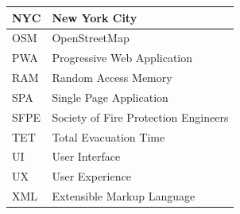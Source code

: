 \documentclass[12pt,a4paper,oneside]{report}
\begin{document}
\begin{table}[H]
\begin{tabular}{|l|l|}
\hline
NYC & New York City \\
\hline
OSM & OpenStreetMap \\
\hline
PWA & Progressive Web Application \\
\hline
RAM & Random Access Memory \\
\hline
SPA & Single Page Application \\
\hline
SFPE & Society of Fire Protection Engineers \\
\hline
TET & Total Evacuation Time \\
\hline
UI & User Interface \\
\hline
UX & User Experience \\
\hline
XML & Extensible Markup Language \\
\hline
\end{tabular}
\end{table}
\end{document}
